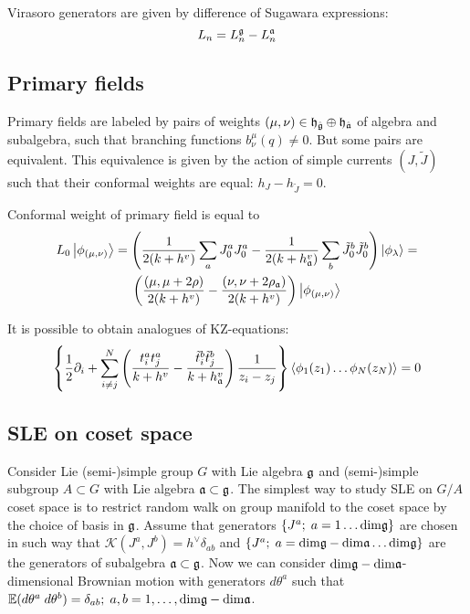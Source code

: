 Virasoro generators are given by difference of Sugawara expressions:
\begin{equation*}
  L_{n}=L_{n}^{\mathfrak{g}}-L_{n}^{\mathfrak{a}}
\end{equation*}

\subsection{Primary fields}
\label{sec:primary-fields}
Primary fields are labeled by pairs of weights $(\mu,\nu)\in \mathfrak{h}_{\hat{\mathfrak{g}}}\oplus \mathfrak{h}_{\hat{\mathfrak{a}}}$  of algebra and subalgebra, such that branching functions $b^{\mu}_{\nu}(q)\neq 0$. But some pairs are equivalent. This equivalence is given by the action of simple currents $(J,\tilde{J})$ such that their conformal weights are equal:  $h_{J}-h_{\tilde{J}}=0$. 

Conformal weight of primary field is equal to
\begin{multline}
  L_0\left|\phi_{(\mu,\nu)}\right>=\left(\frac{1}{2(k+h^v)}\sum_aJ^a_0J^a_0-\frac{1}{2(k+h_{\mathfrak{a}}^v)}\sum_b \tilde{J}^b_0 \tilde{J}^b_0 \right)
  \left|\phi_{\lambda}\right>=\\
  \left(\frac{(\mu,\mu+2\rho)}{2(k+h^v)}-\frac{(\nu,\nu+2\rho_{\mathfrak{a}})}{2(k+h^v)}\right)\left|\phi_{(\mu,\nu)}\right>
\end{multline}


It is possible to obtain analogues of KZ-equations:
\begin{equation*}
  \left\{\frac{1}{2}\partial_{i} + \sum_{i\neq j}^{N}\left(\frac{t^{a}_{i}t^{a}_{j}}{k+h^{v}}-\frac{\tilde t^{b}_{i}\tilde t^{b}_{j}}{k+h^{v}_{\mathfrak{a}}}\right)\frac{1}{z_{i}-z_{j}}\right\} \left<\phi_{1}(z_{1})\dots \phi_{N}(z_{N})\right>=0
\end{equation*}

\subsection{SLE on coset space}
Consider Lie (semi-)simple group $G$ with Lie algebra $\mathfrak{g}$ and (semi-)simple subgroup $A\subset G$ with Lie algebra $\mathfrak{a}\subset \mathfrak{g}$. 
The simplest way to study SLE on $G/A$ coset space is to restrict random walk on group manifold to the coset space by the choice of basis in $\mathfrak{g}$. Assume that generators $\{J^{a};\; a=1\dots \mathrm{dim}\mathfrak{g}\}$ are chosen in such way that $\mathcal{K}(J^{a},J^{b})=h^{\vee}\delta_{ab}$ and $\{J^{a};\; a=\mathrm{dim}\mathfrak{g}-\mathrm{dim}\mathfrak{a}\dots \mathrm{dim}\mathfrak{g}\}$ are the generators of subalgebra $\mathfrak{a}\subset \mathfrak{g}$. Now we can consider $\mathrm{dim}\mathfrak{g}-\mathrm{dim}\mathfrak{a}$-dimensional Brownian motion with generators $d\theta^{a}$ such that $\mathbb{E}(d\theta^{a} \; d\theta^{b})=\delta_{ab};\; a,b=1,\dots,\mathrm{dim}\mathfrak{g}-\mathrm{dim}\mathfrak{a}$.

